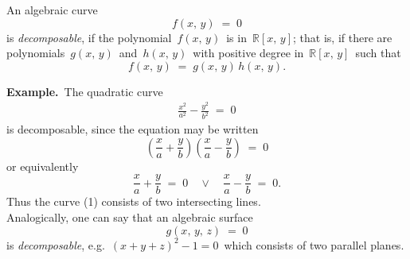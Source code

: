 \documentclass[12pt]{article}
\theoremstyle{definition}
\begin{document}
An algebraic curve
$$f(x,\,y) \;=\; 0$$
is \emph{decomposable}, if the polynomial \,$f(x,\,y)$\, is  in\, $\mathbb{R}[x,\,y]$; that is, if there are polynomials\, $g(x,\,y)$\, and \,$h(x,\,y)$\, with positive degree in\, $\mathbb{R}[x,\,y]$\, such that 
$$f(x,\,y) \;=\; g(x,\,y)\,h(x,\,y).$$

\textbf{Example.}\, The quadratic curve
\begin{align}
\frac{x^2}{a^2}\!-\!\frac{y^2}{b^2} \;=\; 0
\end{align}
is decomposable, since the equation may be written
$$\left(\frac{x}{a}\!+\!\frac{y}{b}\right)\!\left(\frac{x}{a}\!-\!\frac{y}{b}\right) \;=\; 0$$
or equivalently
$$\frac{x}{a}\!+\!\frac{y}{b} \;=\; 0 \quad \lor \quad \frac{x}{a}\!-\!\frac{y}{b} \;=\; 0.$$
Thus the curve (1) consists of two intersecting lines.\\

Analogically, one can say that an algebraic surface 
$$g(x,\,y,\,z) \;=\; 0$$
is \emph{decomposable}, e.g.\, $(x\!+\!y\!+\!z)^2\!-\!1 = 0$\, which consists of two parallel planes.

\end{document}
